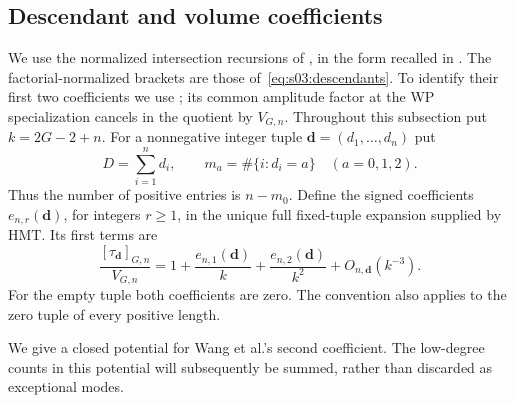 \subsection{Descendant and volume coefficients}
\label{subsec:a:01}

We use the normalized intersection recursions of
\cite[Section~2]{MZ15}, in the form recalled in
\cite[Theorem~4.3]{HMT25}. The factorial-normalized brackets are those
of~\eqref{eq:s03:descendants}. To identify their first two coefficients
we use \cite[Lemma~7.2 and Appendix~C.1]{W26}; its common amplitude
factor at the WP specialization cancels in the quotient by $V_{G,n}$.
Throughout this subsection put $k=2G-2+n$. For a nonnegative integer
tuple $\mathbf d=(d_1,\ldots,d_n)$ put
\[
 D=\sum_{i=1}^n d_i,\qquad
 m_a=\#\{i:d_i=a\}\quad(a=0,1,2).
\]
Thus the number of positive entries is $n-m_0$. Define the signed
coefficients $e_{n,r}(\mathbf d)$, for integers $r\geq1$, in the
unique full fixed-tuple expansion supplied by HMT. Its first terms are
\begin{equation}\label{eq:a:profile-definition}
 \frac{[\tau_{\mathbf d}]_{G,n}}{V_{G,n}}
 =1+\frac{e_{n,1}(\mathbf d)}k
     +\frac{e_{n,2}(\mathbf d)}{k^2}+O_{n,\mathbf d}(k^{-3}).
\end{equation}
For the empty tuple both coefficients are zero. The convention also
applies to the zero tuple of every positive length.

We give a closed potential for Wang et al.'s second coefficient.
The low-degree counts in this potential will subsequently be
summed, rather than discarded as exceptional modes.

